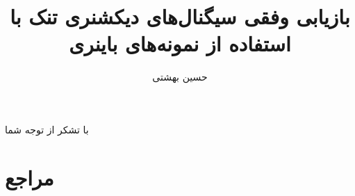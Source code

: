 \documentclass{beamer}
\begin{document}
\title{بازیابی وفقی سیگنال‌های دیکشنری تنک با استفاده از نمونه‌های باینری}
\subtitle{}
\author{حسین بهشتی}


\begin{frame}
\maketitle
\end{frame}


\begin{frame}
\begin{center}
\begin{Huge}
با تشکر از توجه شما
\end{Huge}
\end{center}
\end{frame}
\section{مراجع\hfill}
\begin{frame}[t,allowframebreaks]

\begin{latin}

\end{latin}
\end{frame}

\end{document}
